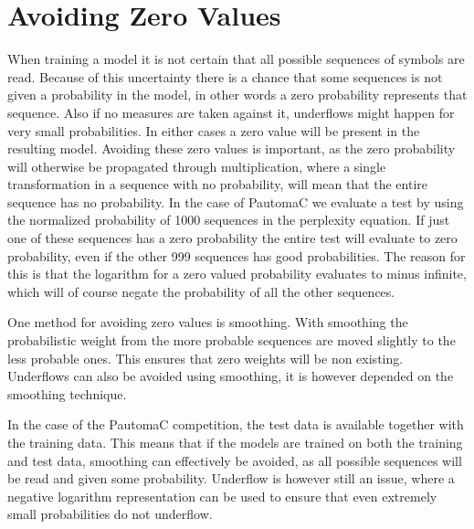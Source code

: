 \section{Avoiding Zero Values}

When training a model it is not certain that all possible sequences of symbols are read. Because of this uncertainty there is a chance that some sequences is not given a probability in the model, in other words a zero probability represents that sequence. Also if no measures are taken against it, underflows might happen for very small probabilities. In either cases a zero value will be present in the resulting model. Avoiding these zero values is important, as the zero probability will otherwise be propagated through multiplication, where a single transformation in a sequence with no probability, will mean that the entire sequence has no probability. In the case of PautomaC we evaluate a test by using the normalized probability of 1000 sequences in the perplexity equation. If just one of these sequences has a zero probability the entire test will evaluate to zero probability, even if the other 999 sequences has good probabilities. The reason for this is that the logarithm for a zero valued probability evaluates to minus infinite, which will of course negate the probability of all the other sequences.


One method for avoiding zero values is smoothing. With smoothing the probabilistic weight from the more probable sequences are moved slightly to the less probable ones. This ensures that zero weights will be non existing. Underflows can also be avoided using smoothing, it is however depended on the smoothing technique.


In the case of the PautomaC competition, the test data is available together with the training data. This means that if the models are trained on both the training and test data, smoothing can effectively be avoided, as all possible sequences will be read and given some probability. Underflow is however still an issue, where a negative logarithm representation can be used to ensure that even extremely small probabilities do not underflow.
